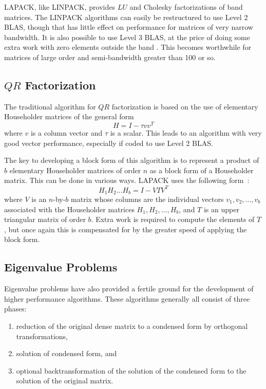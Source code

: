 LAPACK, like LINPACK, provides $LU$ and Cholesky factorizations of
band matrices. The LINPACK algorithms can easily be restructured to use
Level 2 BLAS, though that has little effect on performance for
matrices of very narrow bandwidth. It is also possible to use Level 3 BLAS,
at the price of doing some extra work with zero elements outside the band
\cite{lapwn21}. This becomes worthwhile for matrices of large order and
semi-bandwidth greater than 100 or so.

\subsection{$QR$ Factorization}\label{subsecblockqr}

The traditional algorithm for $QR$
factorization  is based on the use of
elementary Householder
matrices of the general form
$$
H = I - \tau v v^T
$$
where $v$ is a column vector and $\tau$ is a scalar.
This leads to an algorithm with very good vector performance, especially
if coded to use Level 2 BLAS.

The key to developing a block form of this algorithm is to represent a
product
of $b$ elementary Householder matrices of order $n$ as a block
form of a Householder matrix. This can be done in
various ways.
LAPACK uses the following form~\cite{Schreiber87a}:
$$
        H_1 H_2 \ldots H_b = I - V T V^T
$$
where $V$ is an $n$-by-$b$ matrix whose columns are the individual vectors
$v_1, v_2, \ldots , v_b$ associated with the Householder matrices $H_1, H_2,
\ldots , H_b$, and $T$ is an upper triangular matrix of order $b$.
Extra work is required to compute the elements of $T$, but once again this
is compensated for by the greater speed of applying the block form.

\subsection{Eigenvalue Problems}\label{subsecblockeig}

Eigenvalue problems have also
provided a fertile ground for the development of higher performance
algorithms. These algorithms generally all consist of three phases:

\begin{enumerate}

\item reduction of the original dense matrix to a condensed form
by orthogonal transformations,
\item solution of condensed form, and
\item optional backtransformation of the solution of the condensed form
to the solution of the original matrix.

\end{enumerate}

